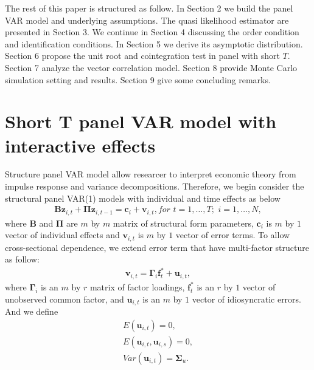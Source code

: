 \documentclass[12pt,a4paper,hyperref]{article}
\begin{document}
The rest of this paper is structured as follow. In Section 2 we build the panel VAR model and underlying assumptions. The quasi likelihood estimator are presented in Section 3. We continue in Section 4 discussing the order condition and identification conditions. In Section 5 we derive its asymptotic distribution. Section 6 propose the unit root and cointegration test in panel with short $T$. Section 7 analyze the vector correlation model. Section 8 provide Monte Carlo simulation setting and results. Section 9 give some concluding remarks.







\section{Short T panel VAR model with interactive effects}
Structure panel VAR model allow researcer to interpret economic theory from impulse response  and variance decompositions.
Therefore,  we begin consider the structural panel VAR(1) models with individual and time effects as below
\begin{align}
\boldsymbol{B}\boldsymbol{z}_{i,t}+\boldsymbol{\Pi}\boldsymbol{z}_{i,t-1}=\boldsymbol{c}_{i}+\boldsymbol{v}_{i,t}, for \,\, t=1,\ldots, T;\,\,i=1,\ldots,N, \label{1.1}
\end{align}
where $\boldsymbol{B}$ and $\boldsymbol{\Pi}$ are $m$ by $m$ matrix of structural form parameters, $\boldsymbol{c}_{i}$ is $m$ by $1$ vector of individual effects and $\boldsymbol{v}_{i,t}$  is $m$ by $1$ vector of error terms.  To allow cross-sectional dependence, we  extend error term that have multi-factor structure as follow:
\begin{align}
\boldsymbol{v}_{i,t}=\boldsymbol{\Gamma}_{i}\boldsymbol{f}^{\ast}_{t}+\boldsymbol{u}_{i,t},
\end{align}
where  $\boldsymbol{\Gamma}_{i}$ is an $m$ by $r$ matrix of factor loadings, $\boldsymbol{f}^{\ast}_{t}$ is an $r$ by $1$ vector of unobserved common factor, and $\boldsymbol{u}_{i,t}$ is an $m$ by $1$ vector of idiosyncratic errors.
And we define
\begin{align}
E(\boldsymbol{u}_{i,t})=0, \\
E(\boldsymbol{u}_{i,t}, \boldsymbol{u}_{i,s})=0, \\
Var(\boldsymbol{u}_{i,t})=\boldsymbol{\Sigma}_{u}.
\end{align}
\end{document}
